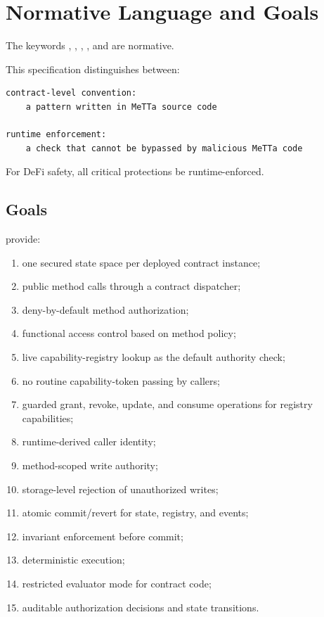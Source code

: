 \section{Normative Language and Goals}

The keywords \MUST{}, \MUSTNOT{}, \SHOULD{}, \SHOULDNOT{}, and \MAY{} are normative.

This specification distinguishes between:

\begin{lstlisting}
contract-level convention:
    a pattern written in MeTTa source code

runtime enforcement:
    a check that cannot be bypassed by malicious MeTTa code
\end{lstlisting}

For DeFi safety, all critical protections \MUST{} be runtime-enforced.

\subsection{Goals}

\SCS{} \MUST{} provide:

\begin{enumerate}
  \item one secured state space per deployed contract instance;
  \item public method calls through a contract dispatcher;
  \item deny-by-default method authorization;
  \item functional access control based on method policy;
  \item live capability-registry lookup as the default authority check;
  \item no routine capability-token passing by callers;
  \item guarded grant, revoke, update, and consume operations for registry capabilities;
  \item runtime-derived caller identity;
  \item method-scoped write authority;
  \item storage-level rejection of unauthorized writes;
  \item atomic commit/revert for state, registry, and events;
  \item invariant enforcement before commit;
  \item deterministic execution;
  \item restricted \PeTTa{} evaluator mode for contract code;
  \item auditable authorization decisions and state transitions.
\end{enumerate}

